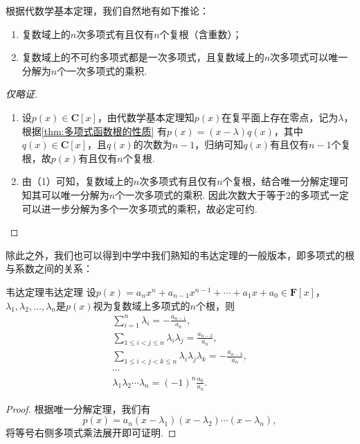 根据代数学基本定理，我们自然地有如下推论：
\begin{corollary}{}{}
    \begin{enumerate}
        \item 复数域上的$n$次多项式有且仅有$n$个复根（含重数）；
        \item 复数域上的不可约多项式都是一次多项式，且复数域上的$n$次多项式可以唯一分解为$n$个一次多项式的乘积.
    \end{enumerate}
\end{corollary}
\begin{proof}[仅略证]
    \begin{enumerate}
        \item 设$p(x)\in\mathbf{C}[x]$，由代数学基本定理知$p(x)$在复平面上存在零点，记为$\lambda$，根据\autoref{thm:多项式函数根的性质} 有$p(x)=(x-\lambda)q(x)$，其中$q(x)\in\mathbf{C}[x]$，且$q(x)$的次数为$n-1$，归纳可知$q(x)$有且仅有$n-1$个复根，故$p(x)$有且仅有$n$个复根.
        \item 由（1）可知，复数域上的$n$次多项式有且仅有$n$个复根，结合唯一分解定理可知其可以唯一分解为$n$个一次多项式的乘积. 因此次数大于等于$2$的多项式一定可以进一步分解为多个一次多项式的乘积，故必定可约.
    \end{enumerate}
\end{proof}

除此之外，我们也可以得到中学中我们熟知的韦达定理的一般版本，即多项式的根与系数之间的关系：
\begin{theorem}{韦达定理}{韦达定理}
    设$p(x)=a_nx^n+a_{n-1}x^{n-1}+\cdots+a_1x+a_0\in\mathbf{F}[x]$，$\lambda_1,\lambda_2,\ldots,\lambda_n$是$p(x)$视为复数域上多项式的$n$个根，则
    \begin{gather*}
        \sum\limits_{i=1}^n\lambda_i=-\frac{a_{n-1}}{a_n},\\
        \sum\limits_{1\leqslant i<j\leqslant n}\lambda_i\lambda_j=\frac{a_{n-2}}{a_n},\\
        \sum\limits_{1\leqslant i<j<k\leqslant n}\lambda_i\lambda_j\lambda_k=-\frac{a_{n-3}}{a_n},\\
        \cdots\\
        \lambda_1\lambda_2\cdots\lambda_n=(-1)^n\frac{a_0}{a_n}.
    \end{gather*}
\end{theorem}
\begin{proof}
    根据唯一分解定理，我们有
    \[p(x)=a_n(x-\lambda_1)(x-\lambda_2)\cdots(x-\lambda_n),\]
    将等号右侧多项式乘法展开即可证明.
\end{proof}


